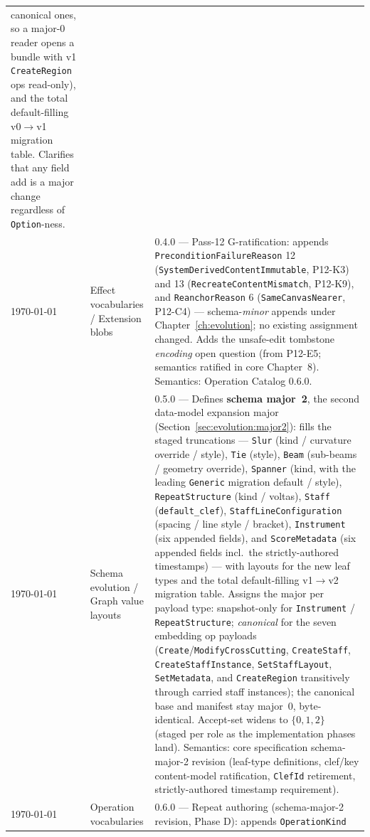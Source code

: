 \documentclass[11pt,letterpaper]{report}
\newcommand{\tablenums}[1]{{\addfontfeatures{Numbers={Lining,Tabular}}#1}}
\newcounter{requirement}[chapter]
\begin{document}
\begin{longtable}{p{2cm} p{2.5cm} p{9cm}}
  canonical ones, so a major-0 reader opens a bundle with v1 \texttt{CreateRegion}
  ops read-only), and the total default-filling v0${\to}$v1 migration table.
  Clarifies that any field add is a major change regardless of
  \texttt{Option}-ness. \\
  \today & Effect vocabularies / Extension blobs & 0.4.0 --- Pass-12
  G-ratification: appends \texttt{PreconditionFailureReason}
  \tablenums{12} (\texttt{SystemDerivedContentImmutable}, P12-K3) and
  \tablenums{13} (\texttt{RecreateContentMismatch}, P12-K9), and
  \texttt{ReanchorReason} \tablenums{6} (\texttt{SameCanvasNearer},
  P12-C4) --- schema-\emph{minor} appends under Chapter~\ref{ch:evolution};
  no existing assignment changed. Adds the unsafe-edit tombstone
  \emph{encoding} open question (from P12-E5; semantics ratified in core
  Chapter~8). Semantics: Operation Catalog 0.6.0. \\
  \today & Schema evolution / Graph value layouts & 0.5.0 --- Defines
  \textbf{schema major~2}, the second data-model expansion major
  (Section~\ref{sec:evolution:major2}): fills the staged truncations ---
  \texttt{Slur} (kind / curvature override / style), \texttt{Tie} (style),
  \texttt{Beam} (sub-beams / geometry override), \texttt{Spanner} (kind,
  with the leading \texttt{Generic} migration default / style),
  \texttt{RepeatStructure} (kind / voltas), \texttt{Staff}
  (\texttt{default\_clef}), \texttt{StaffLineConfiguration} (spacing /
  line style / bracket), \texttt{Instrument} (six appended fields), and
  \texttt{ScoreMetadata} (six appended fields incl.\ the
  strictly-authored timestamps) --- with layouts for the new leaf types
  and the total default-filling v1${\to}$v2 migration table. Assigns the
  major per payload type: snapshot-only for \texttt{Instrument} /
  \texttt{RepeatStructure}; \emph{canonical} for the seven embedding op
  payloads (\texttt{Create}/\texttt{ModifyCrossCutting},
  \texttt{CreateStaff}, \texttt{CreateStaffInstance},
  \texttt{SetStaffLayout}, \texttt{SetMetadata}, and
  \texttt{CreateRegion} transitively through carried staff instances);
  the canonical base and manifest stay major~0, byte-identical.
  Accept-set widens to $\{0, 1, 2\}$ (staged per role as the
  implementation phases land). Semantics: core specification schema-major-2 revision
  (leaf-type definitions, clef/key content-model ratification,
  \texttt{ClefId} retirement, strictly-authored timestamp requirement). \\
  \today & Operation vocabularies & 0.6.0 --- Repeat authoring
  (schema-major-2 revision, Phase D): appends \texttt{OperationKind}

\end{longtable}
\end{document}
